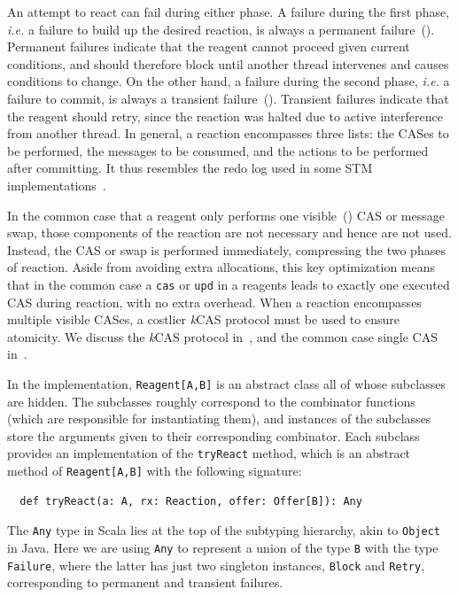 \documentclass[preprint,nocopyrightspace]{sigplanconf}
\begin{document}
An attempt to react can fail during either phase.  A failure during the first
phase, \emph{i.e.} a failure to build up the desired reaction, is always a
permanent failure~().  Permanent failures indicate that the
reagent cannot proceed given current conditions, and should therefore block
until another thread intervenes and causes conditions to change.  On the other
hand, a failure during the second phase, \emph{i.e.} a failure to commit, is
always a transient failure~().  Transient failures indicate that
the reagent should retry, since the reaction was halted due to active
interference from another thread.  
In general, a reaction encompasses three lists: the CASes to be performed, the
messages to be consumed, and the actions to be performed after committing.  It
thus resembles the redo log used in some STM implementations~\cite{Larus2006}.

In the common case that a reagent only performs one visible~()
CAS or message swap, those components of the reaction are not necessary and
hence are not used.  Instead, the CAS or swap is performed immediately,
compressing the two phases of reaction.  Aside from avoiding extra allocations,
this key optimization means that in the common case a \lstinline{cas} or
\lstinline{upd} in a reagents leads to exactly one executed CAS during reaction,
with no extra overhead.  When a reaction encompasses multiple visible CASes, a
costlier \emph{k}CAS protocol must be used to ensure atomicity.  We discuss the
\emph{k}CAS protocol in~, and the common case single CAS
in~.

In the implementation, \lstinline{Reagent[A,B]} is an abstract class all of
whose subclasses are hidden.  The subclasses roughly correspond to the
combinator functions (which are responsible for instantiating them), and
instances of the subclasses store the arguments given to their corresponding
combinator.  Each subclass provides an implementation of the
\lstinline{tryReact} method, which is an abstract method of
\lstinline{Reagent[A,B]} with the following signature:
\begin{lstlisting}
  def tryReact(a: A, rx: Reaction, offer: Offer[B]): Any
\end{lstlisting}
The \lstinline{Any} type in Scala lies at the top of the subtyping hierarchy,
akin to \lstinline{Object} in Java.  Here we are using \lstinline{Any} to
represent a union of the type \lstinline{B} with the type
\lstinline{Failure}, where the latter has just two singleton instances,
\lstinline{Block} and \lstinline{Retry}, corresponding to permanent and
transient failures.  
\end{document}
